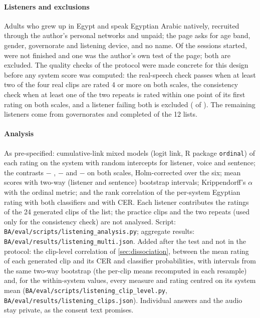 \paragraph{Listeners and exclusions}
Adults who grew up in Egypt and speak Egyptian Arabic natively, recruited through the author's personal networks and unpaid; the
page asks for age band, gender, governorate and listening device, and no name. Of the sessions started,
 were not finished and one was the author's own test of the page; both are excluded. The
quality checks of the protocol were made concrete for this design before any system score was computed: the
real-speech check passes when at least two of the four real clips are rated 4 or more on both scales, the consistency
check when at least one of the two repeats is rated within one point of its first rating on both scales, and a
listener failing both is excluded ( of ). The  remaining listeners come from
 governorates and completed  of the 12 lists.

\paragraph{Analysis}
As pre-specified: cumulative-link mixed models (logit link, R package \texttt{ordinal}) of each rating on the system
with random intercepts for listener, voice and sentence; the contrasts \BA $-$ \vox, \BA $-$ \cbthree and \vox $-$
\cbthree on both scales, Holm-corrected over the six; mean scores with two-way (listener and sentence) bootstrap
intervals; Krippendorff's $\alpha$ with the ordinal metric; and the rank correlation of the per-system Egyptian rating
with both classifiers and with CER. Each listener contributes the ratings of the 24 generated clips of the list; the
practice clips and the two repeats (used only for the consistency check) are not analysed. Script:
\texttt{BA/eval/scripts/listening\_analysis.py}; aggregate results: \texttt{BA/eval/results/listening\_multi.json}.
Added after the test and not in the protocol: the clip-level correlation of \cref{sec:dissociation}, between the mean
rating of each generated clip and its CER and classifier probabilities, with intervals from the same two-way bootstrap
(the per-clip means recomputed in each resample) and, for the within-system values, every measure and rating centred
on its system mean (\texttt{BA/eval/scripts/listening\_clip\_level.py}, \texttt{BA/eval/results/listening\_clips.json}). Individual answers and the audio stay private, as the consent text
promises.

